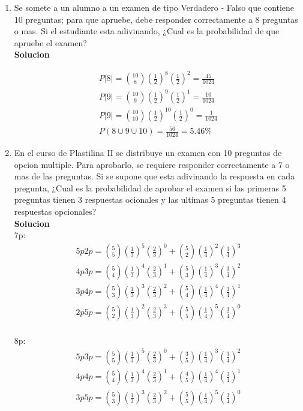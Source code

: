 \begin{enumerate}
    \item Se somete a un alumno a un examen de tipo Verdadero - Falso que contiene 10 preguntas; para que apruebe, debe responder correctamente a 8 preguntas o mas. Si el estudiante esta adivinando,  ¿Cual es la probabilidad de que apruebe el examen?
    \\\textbf{Solucion}
    
    \begin{gather*}
    P|8| = \binom{10}{8}(\frac{1}{2})^8(\frac{1}{2})^2 = \frac{45}{1024}\\
    P|9| = \binom{10}{9}(\frac{1}{2})^9(\frac{1}{2})^1 = \frac{10}{1024}\\
    P|9| = \binom{10}{10}(\frac{1}{2})^{10}(\frac{1}{2})^0 = \frac{1}{1024}\\
    P(8 \cup 9 \cup 10) = \frac{56}{1024} = 5.46\% 
    \end{gather*}
    
    \item En el curso de Plastilina II se distribuye un examen con 10 preguntas de opcion multiple. Para aprobarlo, se requiere responder correctamente a 7 o mas de las preguntas. Si se supone que esta adivinando la respuesta en cada pregunta, ¿Cual es la probabilidad de aprobar el examen si las primeras 5 preguntas tienen 3 respuestas ocionales y las ultimas 5 preguntas tienen 4 respuestas opcionales?
    \\\textbf{Solucion}\\
    7p:
    \begin{gather*}
    5p 2p = \binom{5}{5}(\frac{1}{3})^{5}(\frac{2}{3})^0 + \binom{5}{2}(\frac{1}{4})^{2}(\frac{3}{4})^3\\
    4p 3p = \binom{5}{4}(\frac{1}{3})^{4}(\frac{2}{3})^1 + \binom{5}{3}(\frac{1}{4})^{3}(\frac{3}{4})^2\\
    3p 4p = \binom{5}{3}(\frac{1}{3})^{3}(\frac{2}{3})^2 + \binom{5}{4}(\frac{1}{4})^{4}(\frac{3}{4})^1\\
    2p 5p = \binom{5}{2}(\frac{1}{3})^{2}(\frac{2}{3})^3 + \binom{5}{5}(\frac{1}{4})^{5}(\frac{3}{4})^0\\
    \end{gather*}
    
    8p:
    \begin{gather*}
    5p 3p = \binom{5}{5}(\frac{1}{3})^{5}(\frac{2}{3})^0 + \binom{3}{5}(\frac{1}{4})^{3}(\frac{3}{4})^2\\
    4p 4p = \binom{5}{4}(\frac{1}{3})^{4}(\frac{2}{3})^1 + \binom{4}{5}(\frac{1}{4})^{4}(\frac{3}{4})^1\\
    3p 5p = \binom{5}{3}(\frac{1}{3})^{3}(\frac{2}{3})^2 + \binom{5}{5}(\frac{1}{4})^{5}(\frac{3}{4})^0\\
    \end{gather*}
    

\end{enumerate}
